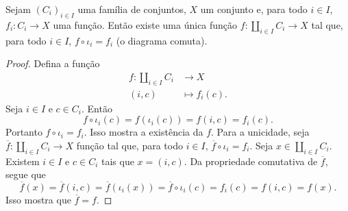 \begin{prop}
Sejam $(C_i)_{i \in I}$ uma família de conjuntos, $X$ um conjunto e, para todo $i \in I$, $f_i: C_i \to X$ uma função. Então existe uma única função $f: \coprod_{i \in I} C_i \to X$ tal que, para todo $i \in I$, $f \circ \iota_i = f_i$ (o diagrama comuta).
\begin{figure}
\centering
{}
\end{figure}
\end{prop}
\begin{proof}
Defina a função
	\begin{align*}
	f: \coprod_{i \in I} C_i &\to X \\
		(i,c) &\mapsto f_i(c).
	\end{align*}
Seja $i \in I$ e $c \in C_i$. Então
	\begin{equation*}
	f \circ \iota_i(c) = f(\iota_i(c)) = f(i,c) = f_i(c).
	\end{equation*}
Portanto $f \circ \iota_i = f_i$. Isso mostra a existência da $f$. Para a unicidade, seja $\overline{f}: \coprod_{i \in I} C_i \to X$ função tal que, para todo $i \in I$, $\overline{f} \circ \iota_i = f_i$. Seja $x \in \coprod_{i \in I} C_i$. Existem $i \in I$ e $c \in C_i$ tais que $x=(i,c)$. Da propriedade comutativa de $\overline{f}$, segue que
	\begin{equation*}
	\overline{f}(x) = \overline{f}(i,c) = \overline{f}(\iota_i(x)) = \overline{f} \circ \iota_i(c) = f_i(c) = f(i,c) = f(x).
	\end{equation*}
Isso mostra que $\overline{f}=f$.
\end{proof}







